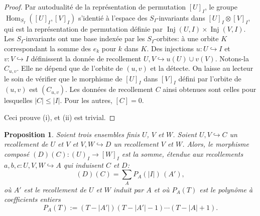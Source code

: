\documentclass[11pt,a4paper]{article}
\theoremstyle{plain}
\newtheorem{proposition}[theorem]{Proposition}
\theoremstyle{definition}
\DeclareMathOperator{\Hom}{Hom}
\DeclareMathOperator{\Inj}{Inj}
\newcommand{\inj}{\hookrightarrow}
\begin{document}
\begin{proof}
Par autodualit\'e de la repr\'esentation de permutation $[U]_I$, le groupe $\Hom_{S_I}([U]_I, [V]_I)$ s'identi\'e \`a l'espace des $S_I$-invariants dans $[U]_I \otimes [V]_I$, qui est la repr\'esentation de permutation d\'efinie par $\Inj(U, I) \times \Inj(V, I)$. Les $S_I$-invariants ont une base index\'ee par les $S_I$-orbites: \`a une orbite $K$ correspondant la somme des $e_k$ pour $k$ dans $K$. Des injections $u : U \inj I$ et $v : V \inj I$ d\'efinissent la donn\'ee de recollement $U, V \inj u(U) \cup v(V)$. Notons-la $C_{u,v}$. Elle ne d\'epend que de l'orbite de $(u, v)$ et la d\'etecte. On laisse au lecteur le soin de v\'erifier que le morphisme de $[U]_I$ dans $[V]_I$ d\'efini par l'orbite de $(u, v)$ est $(C_{u,v})$. Les donn\'ees de recollement $C$ ainsi obtenues sont celles pour lesquelles $|C| \leq |I|$. Pour les autres, $[C] = 0$.

Ceci prouve (i), et (ii) est trivial.
\end{proof}

\begin{proposition}
Soient trois ensembles finis $U$, $V$ et $W$. Soient $U, V \inj C$ un recollement de $U$ et $V$ et $V, W \inj D$ un recollement $V$ et $W$. Alors, le morphisme compos\'e $(D)(C) : (U)_I \to [W]_I$ est la somme, \'etendue aux recollements $a, b, c : U, V, W \inj A$ qui induisent $C$ et $D$:
\begin{equation}
(D)(C) = \sum_A P_A(|I|)\,(A'), \tag{2.10.1}
\end{equation}
o\`u $A'$ est le recollement de $U$ et $W$ induit par $A$ et o\`u $P_A(T)$ est le polyn\^ome \`a coefficients entiers
\begin{equation}
P_A(T) := (T - |A'|)(T - |A'| - 1) \cdots (T - |A| + 1). \tag{2.10.2}
\end{equation}
\end{proposition}
\end{document}
